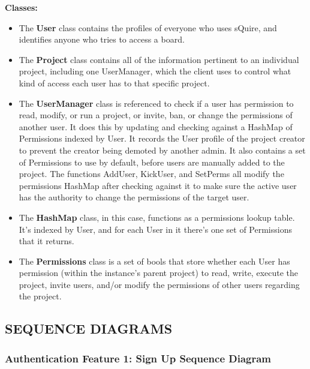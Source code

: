 \documentclass[twoside,letterpaper]{article}
\begin{document}
	\textbf{Classes:}
	\begin{itemize}
	
		\item The \textbf{User} class contains the profiles of everyone who uses sQuire, and identifies anyone who tries to access a board.
		\item The \textbf{Project} class contains all of the information pertinent to an individual project, including one UserManager, which the client uses to control what kind of access each user has to that specific project.
		\item The \textbf{UserManager} class is referenced to check if a user has permission to read, modify, or run a project, or invite, ban, or change the permissions of another user. It does this by updating and checking against a HashMap of Permissions indexed by User. It records the User profile of the project creator to prevent the creator being demoted by another admin. It also contains a set of Permissions to use by default, before users are manually added to the project.
		The functions AddUser, KickUser, and SetPerms all modify the permissions HashMap after checking against it to make sure the active user has the authority to change the permissions of the target user.
		\item The \textbf{HashMap} class, in this case, functions as a permissions lookup table. It's indexed by User, and for each User in it there's one set of Permissions that it returns.
		\item The \textbf{Permissions} class is a set of bools that store whether each User has permission (within the instance's parent project) to read, write, execute the project, invite users, and/or modify the permissions of other users regarding the project.
	\end{itemize}
	
	\newpage










\subsection[SEQUENCE DIAGRAMS]{\rmfamily\bfseries SEQUENCE DIAGRAMS}


	\subsubsection[Authentication Feature 1: Sign Up Sequence Diagram]{\rmfamily\bfseries\color{black}
		Authentication Feature 1: Sign Up Sequence Diagram}
		\label{a:sd1}
	\hypertarget{RefHeading22059017292}{}
	
\end{document}
